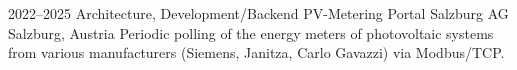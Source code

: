 \cventry
{2022--2025}
{Architecture, Development/Backend}
{PV-Metering Portal}
{Salzburg AG}
{Salzburg, Austria}
{
  Periodic polling of the energy meters of photovoltaic systems from various
  manufacturers (Siemens, Janitza, Carlo Gavazzi) via Modbus/TCP.
}
